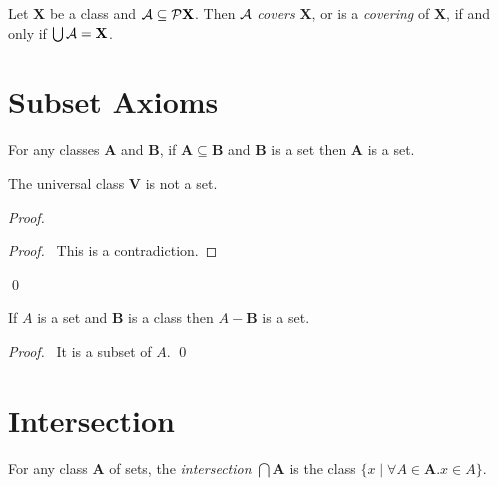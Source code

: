 \begin{definition}[Cover]
    Let $\mathbf{X}$ be a class and $\mathbf{\AA} \subseteq \pow \mathbf{X}$. 
    Then $\mathbf{\AA}$ \emph{covers} $\mathbf{X}$,
    or is a \emph{covering} of $\mathbf{X}$, if and only if
    $\bigcup \mathbf{\AA} = \mathbf{X}$.
\end{definition}

\section{Subset Axioms}

\begin{axioms}
    For any classes $\mathbf{A}$ and $\mathbf{B}$,
    if $\mathbf{A} \subseteq \mathbf{B}$ and $\mathbf{B}$ is a set
    then $\mathbf{A}$ is a set.
\end{axioms}

\begin{theorem}[Subset]
    The universal class $\mathbf{V}$ is not a set.
\end{theorem}

\begin{proof}
    \pf
    \qedstep
    \begin{proof}
        \pf\ This is a contradiction.
    \end{proof}
    \qed
\end{proof}

\begin{theorem}[Subset]
    If $A$ is a set and $\mathbf{B}$ is a class then $A - \mathbf{B}$ is a set.
\end{theorem}

\begin{proof}
    \pf\ It is a subset of $A$. \qed
\end{proof}

\section{Intersection}

\begin{definition}[Intersection]
    For any class $\mathbf{A}$ of sets, the \emph{intersection}
    $\bigcap \mathbf{A}$ is the class $\{ x \mid \forall A \in \mathbf{A}. x \in A \}$.
\end{definition}

